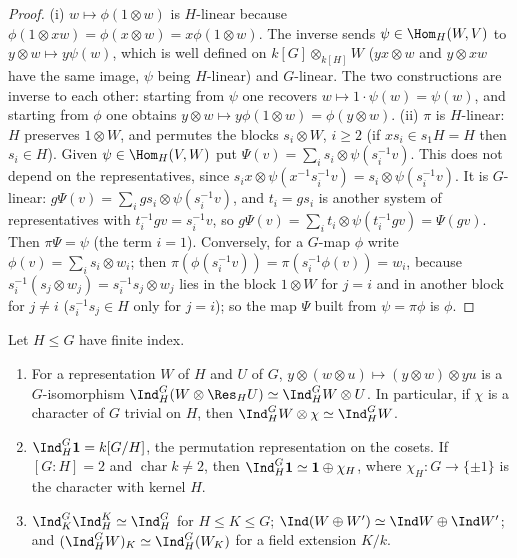 \begin{proof}
(i) $w\mapsto\phi(1\otimes w)$ is $H$-linear because $\phi(1\otimes xw)=\phi(x\otimes w)=x\phi(1\otimes w)$. The inverse sends $\psi\in\Hom_H(W,V)$ to
$y\otimes w\mapsto y\psi(w)$, which is well defined on $k[G]\otimes_{k[H]}W$ ($yx\otimes w$ and $y\otimes xw$ have the same image, $\psi$ being $H$-linear) and
$G$-linear. The two constructions are inverse to each other: starting from $\psi$ one recovers $w\mapsto1\cdot\psi(w)=\psi(w)$, and starting
from $\phi$ one obtains $y\otimes w\mapsto y\phi(1\otimes w)=\phi(y\otimes w)$.
(ii) $\pi$ is $H$-linear: $H$ preserves $1\otimes W$, and permutes the blocks $s_i\otimes W$, $i\ge2$ (if $xs_i\in s_1H=H$ then $s_i\in H$). Given $\psi\in
\Hom_H(V,W)$ put $\Psi(v)=\sum_is_i\otimes\psi(s_i^{-1}v)$. This does not depend on the representatives, since $s_ix\otimes\psi(x^{-1}s_i^{-1}v)=s_i\otimes\psi(s_i^{-1}v)$.
It is $G$-linear: $g\Psi(v)=\sum_igs_i\otimes\psi(s_i^{-1}v)$, and $t_i=gs_i$ is another system of representatives with $t_i^{-1}gv=s_i^{-1}v$, so
$g\Psi(v)=\sum_it_i\otimes\psi(t_i^{-1}gv)=\Psi(gv)$. Then $\pi\Psi=\psi$ (the term $i=1$). Conversely, for a $G$-map $\phi$ write $\phi(v)=\sum_is_i\otimes w_i$;
then $\pi(\phi(s_i^{-1}v))=\pi(s_i^{-1}\phi(v))=w_i$, because $s_i^{-1}(s_j\otimes w_j)=s_i^{-1}s_j\otimes w_j$ lies in the block $1\otimes W$ for $j=i$ and in
another block for $j\ne i$ ($s_i^{-1}s_j\in H$ only for $j=i$); so the map $\Psi$ built from $\psi=\pi\phi$ is $\phi$.
\end{proof}

\begin{proposition}\label{prop:reps:projection-formula}
Let $H\le G$ have finite index.
\begin{enumerate}[label=(\roman*)]
\item For a representation $W$ of $H$ and $U$ of $G$, $y\otimes(w\otimes u)\mapsto(y\otimes w)\otimes yu$ is a $G$-isomorphism
$\Ind_H^G(W\otimes\Res_HU)\simeq\Ind_H^GW\otimes U$. In particular, if $\chi$ is a character of $G$ trivial on $H$, then $\Ind_H^GW\otimes\chi\simeq\Ind_H^GW$.
\item $\Ind_H^G\mathbf1=k[G/H]$, the permutation representation on the cosets. If $[G:H]=2$ and $\operatorname{char}k\ne2$, then $\Ind_H^G\mathbf1\simeq\mathbf1\oplus\chi_H$,
where $\chi_H\colon G\to\{\pm1\}$ is the character with kernel $H$.
\item $\Ind_K^G\Ind_H^K\simeq\Ind_H^G$ for $H\le K\le G$; $\Ind(W\oplus W')\simeq\Ind W\oplus\Ind W'$; and $(\Ind_H^GW)_K\simeq\Ind_H^G(W_K)$ for a field extension
$K/k$.
\end{enumerate}
\end{proposition}

